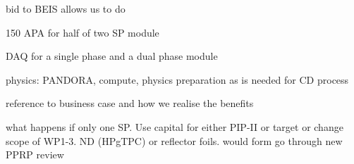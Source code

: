 bid to BEIS allows us to do

150 APA for half of two SP module

DAQ for a single phase and a dual phase module

physics: PANDORA, compute, physics preparation as is needed for CD process

reference to business case and how we realise the benefits

what happens if only one SP. Use capital for either PIP-II or target or change scope of WP1-3. ND (HPgTPC) or reflector foils. would form go through new PPRP review